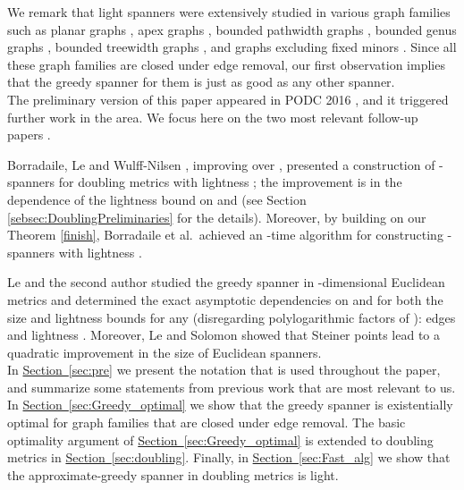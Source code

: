 \documentclass[11pt,letterpaper]{article}
\newcommand{\namedref}[2]{\hyperref[#2]{#1~\ref*{#2}}}
\newcommand{\sectionref}[1]{\namedref{Section}{#1}}
\begin{document}
We remark that light spanners were extensively studied in various graph families such as planar graphs \cite{ADDJS93,Klein05}, apex graphs \cite{GS02},
bounded pathwidth graphs \cite{GH12}, bounded genus graphs \cite{Grigni00,GS02,DHM10}, bounded treewidth graphs \cite{DHM10},
and graphs excluding fixed minors \cite{Grigni00,DHM10,BLW17Minor}.
Since all these graph families are closed under edge removal, our first observation implies that the greedy spanner for them is just as good as any other spanner.
\vspace{6pt}
\\
The preliminary version of this paper appeared in PODC 2016 \cite{FS16}, and it triggered further work in the area.
We focus here on the two most relevant follow-up papers \cite{BLW19,LS19}. 

Borradaile, Le and Wulff{-}Nilsen \cite{BLW19}, improving over  \cite{Got15}, presented a construction of -spanners for doubling metrics with lightness 
; the improvement is in the dependence of the lightness bound on  and  (see Section \ref{sebsec:DoublingPreliminaries} for the details).
Moreover, by building on our Theorem \ref{finish}, Borradaile et al.\  achieved an -time algorithm for constructing -spanners with lightness .

Le and the second author \cite{LS19} studied the greedy spanner in -dimensional Euclidean metrics and determined the exact asymptotic dependencies on  and  for 
both the size and lightness bounds for any  (disregarding polylogarithmic factors of ):  edges and lightness .
Moreover, Le and Solomon \cite{LS19} showed that Steiner points lead to a quadratic improvement in the size of Euclidean spanners.
\vspace{6pt}
\\
In \sectionref{sec:pre} we present the notation that is used throughout the paper, and summarize some statements from previous work that are most relevant to us.
In \sectionref{sec:Greedy_optimal} we show that the greedy spanner is existentially optimal for graph families that are closed under edge removal.
The basic optimality argument of \sectionref{sec:Greedy_optimal} is extended to doubling metrics in \sectionref{sec:doubling}.
Finally, in \sectionref{sec:Fast_alg} we show that the approximate-greedy spanner in doubling metrics is light.
\end{document}
